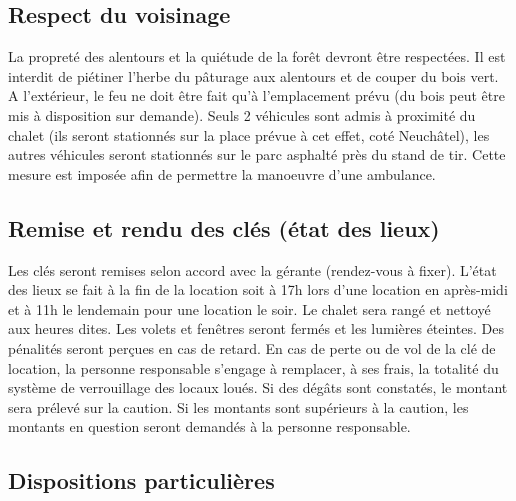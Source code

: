 \documentclass[a4paper,12pt]{extarticle}
\begin{document}
\subsection{Respect du voisinage}
La propreté des alentours et la quiétude de la forêt devront être respectées.
Il est interdit de piétiner l'herbe du pâturage aux alentours et de couper du bois vert.
A l'extérieur, le feu ne doit être fait qu'à l'emplacement prévu (du bois peut être mis à disposition sur demande).
Seuls 2 véhicules sont admis à proximité du chalet (ils seront stationnés sur la place prévue à cet effet, coté Neuchâtel), les autres véhicules seront stationnés sur le parc asphalté près du stand de tir. Cette mesure est imposée afin de permettre la manoeuvre d'une ambulance.

\subsection{Remise et rendu des clés (état des lieux)}
Les clés seront remises selon accord avec la gérante (rendez-vous à fixer).
{\color{red} L'état des lieux se fait à la fin de la location} soit à 17h lors d'une location en après-midi et à 11h le lendemain pour une location le soir.
Le chalet sera rangé et nettoyé aux heures dites. Les volets et fenêtres seront fermés et les lumières éteintes.
{\color{red} Des pénalités seront perçues en cas de retard.
En cas de perte ou de vol de la clé de location, la personne responsable s'engage à remplacer, à ses frais, la totalité du système de verrouillage des locaux loués.
Si des dégâts sont constatés, le montant sera prélevé sur la caution. Si les montants sont supérieurs à la caution, les montants en question seront demandés à la personne responsable.}


\subsection{Dispositions particulières}
\end{document}
